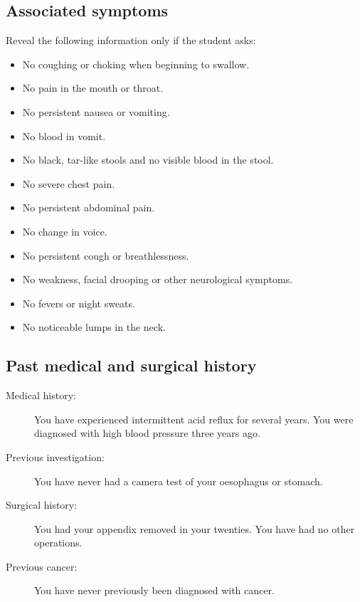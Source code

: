 \subsection*{Associated symptoms}

Reveal the following information only if the student asks:

\begin{itemize}
    \item No coughing or choking when beginning to swallow.
    \item No pain in the mouth or throat.
    \item No persistent nausea or vomiting.
    \item No blood in vomit.
    \item No black, tar-like stools and no visible blood in the stool.
    \item No severe chest pain.
    \item No persistent abdominal pain.
    \item No change in voice.
    \item No persistent cough or breathlessness.
    \item No weakness, facial drooping or other neurological symptoms.
    \item No fevers or night sweats.
    \item No noticeable lumps in the neck.
\end{itemize}

\subsection*{Past medical and surgical history}

\begin{description}
    \item[Medical history:]
    You have experienced intermittent acid reflux for several years.
    You were diagnosed with high blood pressure three years ago.

    \item[Previous investigation:]
    You have never had a camera test of your oesophagus or stomach.

    \item[Surgical history:]
    You had your appendix removed in your twenties. You have had no
    other operations.

    \item[Previous cancer:]
    You have never previously been diagnosed with cancer.
\end{description}

